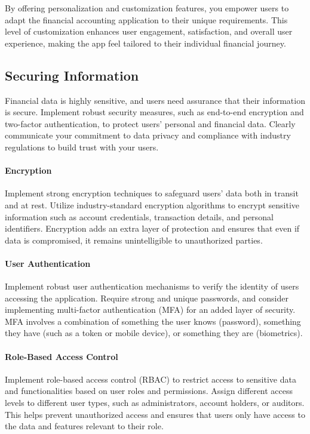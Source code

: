 By offering personalization and customization features, you empower users to adapt the financial accounting 
application to their unique requirements. This level of customization enhances user engagement, satisfaction, 
and overall user experience, making the app feel tailored to their individual financial journey.


\subsection{Securing Information}

Financial data is highly sensitive, and users need assurance that their information is secure. Implement robust 
security measures, such as end-to-end encryption and two-factor authentication, to protect users' personal and 
financial data. Clearly communicate your commitment to data privacy and compliance with industry regulations to 
build trust with your users.

\paragraph{Encryption}
Implement strong encryption techniques to safeguard users' data both in transit and at rest. Utilize 
industry-standard encryption algorithms to encrypt sensitive information such as account credentials, transaction 
details, and personal identifiers. Encryption adds an extra layer of protection and ensures that even if data is 
compromised, it remains unintelligible to unauthorized parties.

\paragraph{User Authentication}
Implement robust user authentication mechanisms to verify the identity of users accessing the 
application. Require strong and unique passwords, and consider implementing multi-factor authentication (MFA) for 
an added layer of security. MFA involves a combination of something the user knows (password), something they have 
(such as a token or mobile device), or something they are (biometrics).

\paragraph{Role-Based Access Control}
Implement role-based access control (RBAC) to restrict access to sensitive data and 
functionalities based on user roles and permissions. Assign different access levels to different user types, 
such as administrators, account holders, or auditors. This helps prevent unauthorized access and ensures that 
users only have access to the data and features relevant to their role.

